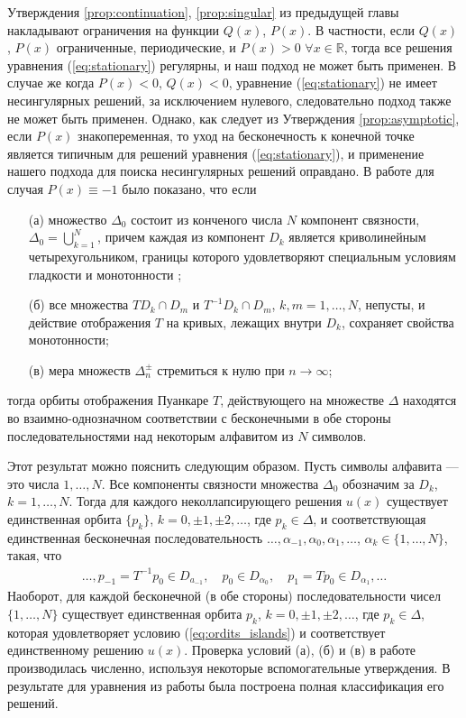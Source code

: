 Утверждения \ref{prop:continuation}, \ref{prop:singular} из предыдущей главы накладывают ограничения на функции $Q(x)$, $P(x)$.
В частности, если $Q(x)$, $P(x)$ ограниченные, периодические, и $P(x) > 0$ $\forall x \in \mathbb{R}$, тогда все решения уравнения (\ref{eq:stationary}) регулярны, и наш подход не может быть применен.
В случае же когда $P(x) < 0$, $Q(x) < 0$, уравнение (\ref{eq:stationary}) не имеет несингулярных решений, за исключением нулевого, следовательно подход также не может быть применен.
Однако, как следует из Утверждения \ref{prop:asymptotic}, если $P(x)$ знакопеременная, то уход на бесконечность к конечной точке является типичным для решений уравнения (\ref{eq:stationary}), и применение нашего подхода для поиска несингулярных решений оправдано.
В работе \cite{AlfAvr} для случая $P(x) \equiv -1$ было показано, что если
%
\begin{itemize}
\item[(а)] множество $\Delta_0$ состоит из конченого числа $N$ компонент связности, $\Delta_0 = \bigcup_{k=1}^N$, причем каждая из компонент $D_k$ является криволинейным четырехугольником, границы которого удовлетворяют специальным условиям гладкости и монотонности \cite{AlfAvr};
\item[(б)] все множества $T D_k \cap D_m$ и $T^{-1} D_k \cap D_m$, $k,m = 1, \dots, N$, непусты, и действие отображения $T$ на кривых, лежащих внутри $D_k$, сохраняет свойства монотонности;
\item[(в)] мера множеств $\Delta_n^{\pm}$ стремиться к нулю при $n \to \infty$; 
\end{itemize}
%
тогда орбиты отображения Пуанкаре $T$, действующего на множестве $\Delta$ находятся во взаимно-однозначном соответствии с бесконечными в обе стороны последовательностями над некоторым алфавитом из $N$ символов.

Этот результат можно пояснить следующим образом.
Пусть символы алфавита --- это числа $1, \dots, N$.
Все компоненты связности множества $\Delta_0$ обозначим за $D_k$, $k = 1, \dots, N$.
Тогда для каждого неколлапсирующего решения $u(x)$ существует единственная орбита $\{ p_k \}$, $k = 0, \pm 1, \pm 2, \dots$, где $p_k \in \Delta$, и соответствующая единственная бесконечная последовательность $\dots, \alpha_{-1}, \alpha_0, \alpha_1, \dots$, $\alpha_k \in \{ 1, \dots, N \}$, такая, что
%
\begin{eqnarray}
\dots, p_{-1} = T^{-1} p_0 \in D_{a_{-1}}, \quad p_0 \in D_{\alpha_0}, \quad p_1 = Tp_0 \in D_{\alpha_1}, \dots
\label{eq:ordits_islands}
\end{eqnarray}
%
Наоборот, для каждой бесконечной (в обе стороны) последовательности чисел $\{ 1, \dots, N \}$ существует единственная орбита ${p_k}$, $k = 0, \pm 1, \pm 2, \dots$, где $p_k \in \Delta$, которая удовлетворяет условию (\ref{eq:ordits_islands}) и соответствует единственному решению $u(x)$.
Проверка условий (а), (б) и (в) в работе \cite{AlfAvr} производилась численно, используя некоторые вспомогательные утверждения.
В результате для уравнения из работы \cite{AlfAvr} была построена полная классификация его решений.

